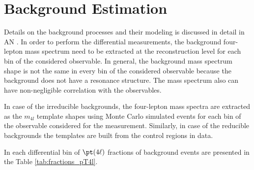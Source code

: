 \section{Background Estimation}

Details on the background processes and their modeling is discussed in detail in AN \cite{CMS-PAS-HIG-19-001}.
In order to perform the differential measurements, the background four-lepton mass spectrum
 need to be extracted at the reconstruction level for each bin of the considered observable. In
 general, the background mass spectrum shape is not the same in every bin of the considered
 observable because the background does not have a resonance structure. The mass spectrum
 also can have non-negligible correlation with the observables. 
\par In case of the irreducible backgrounds, the four-lepton mass spectra are extracted as the $m_{4l}$
template shapes using Monte Carlo simulated events for each bin of the observable considered
 for the measurement. Similarly, in case of the reducible backgrounds the templates are built
 from the control regions in data.
\par In each differential bin of $\pt(4\ell)$ fractions of background events are presented in the Table \ref{tab:fractions_pT4l}.

